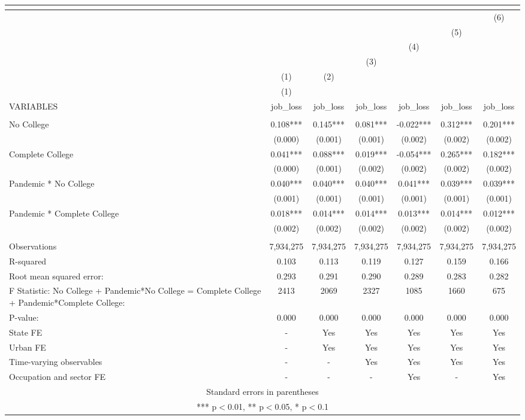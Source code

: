 \begin{tabular}{lcccccc}
\multicolumn{7}{c}{} \\ \hline
 &  &  &  &  &  & (6) \\
 &  &  &  &  & (5) &  \\
 &  &  &  & (4) &  &  \\
 &  &  & (3) &  &  &  \\
 & (1) & (2) &  &  &  &  \\
 & (1) &  &  &  &  &  \\
VARIABLES & job\_loss & job\_loss & job\_loss & job\_loss & job\_loss & job\_loss \\ \hline
 &  &  &  &  &  &  \\
No College & 0.108*** & 0.145*** & 0.081*** & -0.022*** & 0.312*** & 0.201*** \\
 & (0.000) & (0.001) & (0.001) & (0.002) & (0.002) & (0.002) \\
Complete College & 0.041*** & 0.088*** & 0.019*** & -0.054*** & 0.265*** & 0.182*** \\
 & (0.000) & (0.001) & (0.002) & (0.002) & (0.002) & (0.002) \\
Pandemic * No College & 0.040*** & 0.040*** & 0.040*** & 0.041*** & 0.039*** & 0.039*** \\
 & (0.001) & (0.001) & (0.001) & (0.001) & (0.001) & (0.001) \\
Pandemic * Complete College & 0.018*** & 0.014*** & 0.014*** & 0.013*** & 0.014*** & 0.012*** \\
 & (0.002) & (0.002) & (0.002) & (0.002) & (0.002) & (0.002) \\
 &  &  &  &  &  &  \\
Observations & 7,934,275 & 7,934,275 & 7,934,275 & 7,934,275 & 7,934,275 & 7,934,275 \\
R-squared & 0.103 & 0.113 & 0.119 & 0.127 & 0.159 & 0.166 \\
Root mean squared error: & 0.293 & 0.291 & 0.290 & 0.289 & 0.283 & 0.282 \\
F Statistic: No College + Pandemic*No College = Complete College + Pandemic*Complete College: & 2413 & 2069 & 2327 & 1085 & 1660 & 675 \\
\hspace{1mm} P-value: & 0.000 & 0.000 & 0.000 & 0.000 & 0.000 & 0.000 \\
State FE & - & Yes & Yes & Yes & Yes & Yes \\
Urban FE & - & Yes & Yes & Yes & Yes & Yes \\
Time-varying observables & - & - & Yes & Yes & Yes & Yes \\
 Occupation and sector FE & - & - & - & Yes & - & Yes \\ \hline
\multicolumn{7}{c}{ Standard errors in parentheses} \\
\multicolumn{7}{c}{ *** p$<$0.01, ** p$<$0.05, * p$<$0.1} \\
\end{tabular}
